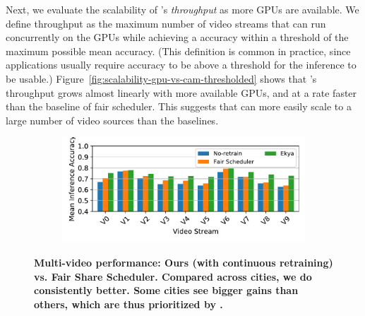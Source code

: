 Next, we evaluate the scalability of \name's {\em throughput} as more GPUs are available.
We define throughput as the maximum number of video streams that can run concurrently on the GPUs while achieving a accuracy within a threshold of the maximum possible mean accuracy.
(This definition is common in practice, since applications usually require accuracy to be above a threshold for the inference to be usable.)
Figure~\ref{fig:scalability-gpu-vs-cam-thresholded} shows that \name's throughput grows almost linearly with more available GPUs, and at a rate \romilc{$2.3\times$} faster than the baseline of fair scheduler.
This suggests that \name can more easily scale to a large number of video sources than the baselines.

\begin{figure}
  \centering
    \begin{subfigure}[t]{\linewidth}
    \centering
    \includegraphics[width=0.9\linewidth]{results/multicam/cityscapes_across_cities.pdf} 
  \end{subfigure}
  \caption{\bf\small Multi-video performance: Ours (with continuous retraining) vs. Fair Share Scheduler. Compared across cities, we do consistently better. Some cities see bigger gains than others, which are thus prioritized by \name{}.}
  \label{fig:multicam-cities}
\end{figure}


